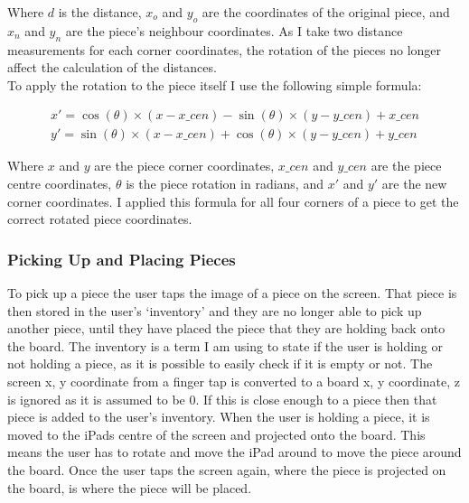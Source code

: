 \documentclass{article}
\begin{document}
Where $d$ is the distance, $x_o$ and $y_o$ are the coordinates of the original
piece, and $x_n$ and $y_n$ are the piece's neighbour coordinates. As I take two
distance measurements for each corner coordinates, the rotation of the pieces no
longer affect the calculation of the distances.\\

To apply the rotation to the piece itself I use the following simple formula:

\begin{equation*}
\begin{aligned}
x' = \cos(\theta) \times (x - x\_cen) - \sin(\theta) \times (y - y\_cen) + x\_cen\\ 
y' = \sin(\theta) \times (x - x\_cen) + \cos(\theta) \times (y - y\_cen) + y\_cen
\end{aligned}
\end{equation*}

Where $x$ and $y$ are the piece corner coordinates, $x\_cen$ and $y\_cen$ are
the piece centre coordinates, $\theta$ is the piece rotation in radians, and
$x'$ and $y'$ are the new corner coordinates. I applied this formula for all four
corners of a piece to get the correct rotated piece coordinates.

\subsubsection{Picking Up and Placing Pieces}
To pick up a piece the user taps the image of a piece on the screen. That piece
is then stored in the user's `inventory' and they are no longer able to pick up
another piece, until they have placed the piece that they are holding back onto
the board. The inventory is a term I am using to state if the user is holding or
not holding a piece, as it is possible to easily check if it is empty or
not. The screen x, y coordinate from a finger tap is converted to a board x, y
coordinate, z is ignored as it is assumed to be 0. If this is close enough to a
piece then that piece is added to the user's inventory. When the user is holding
a piece, it is moved to the iPads centre of the screen and projected onto the
board. This means the user has to rotate and move the iPad around to move the
piece around the board. Once the user taps the screen again, where the piece is
projected on the board, is where the piece will be placed.

\end{document}
